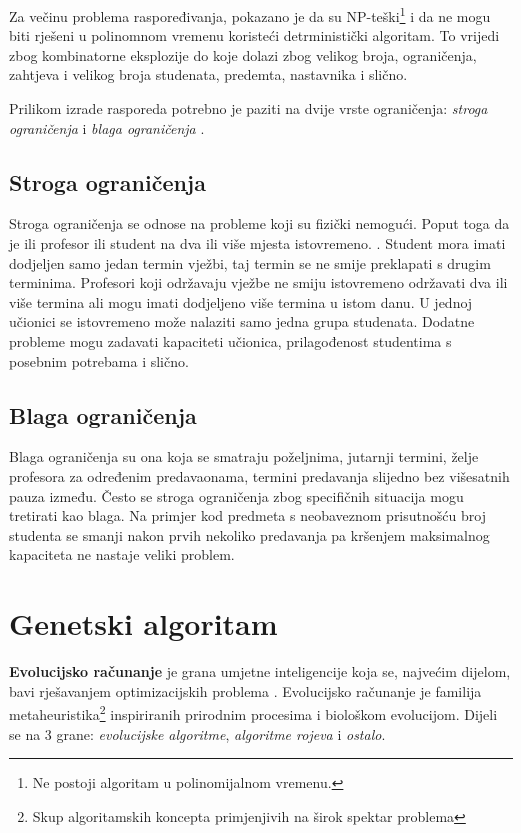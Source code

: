 \documentclass[times, utf8, zavrsni]{fer}
\begin{document}
Za večinu problema raspoređivanja, pokazano je da su NP-teški\footnote{Ne postoji algoritam u polinomijalnom vremenu.} i da ne mogu biti rješeni u polinomnom vremenu koristeći detrministički algoritam. To vrijedi zbog kombinatorne eksplozije do koje dolazi zbog velikog broja, ograničenja, zahtjeva i velikog broja studenata, predemta, nastavnika i slično.

Prilikom izrade rasporeda potrebno je paziti na dvije vrste ograničenja: \emph{stroga ograničenja}  i \emph{blaga ograničenja} .

\section{Stroga ograničenja}

Stroga ograničenja se odnose na probleme koji su fizički nemogući. Poput toga da je ili profesor ili student na dva ili više mjesta istovremeno. \citep{herath2017genetic}. Student mora imati dodjeljen samo jedan termin vježbi, taj termin se ne smije preklapati s drugim terminima. Profesori koji održavaju vježbe ne smiju istovremeno održavati dva ili više termina ali mogu imati dodjeljeno više termina u istom danu. U jednoj učionici se istovremeno može nalaziti samo jedna grupa studenata. Dodatne probleme mogu zadavati kapaciteti učionica, prilagođenost studentima s posebnim potrebama i slično.

\section{Blaga ograničenja}
Blaga ograničenja su ona koja se smatraju poželjnima, jutarnji termini, želje profesora za određenim predavaonama, termini predavanja slijedno bez višesatnih pauza između. Često se stroga ograničenja zbog specifičnih situacija mogu tretirati kao blaga. Na primjer kod predmeta s neobaveznom prisutnošću broj studenta se smanji nakon prvih nekoliko predavanja pa kršenjem maksimalnog kapaciteta ne nastaje veliki problem.

\chapter{Genetski algoritam}
\textbf{Evolucijsko računanje} je grana umjetne inteligencije koja se, najvećim dijelom, bavi rješavanjem optimizacijskih problema \citep{cupic-disertacija}. Evolucijsko računanje je familija metaheuristika\footnote{Skup algoritamskih koncepta primjenjivih na širok spektar problema} inspiriranih prirodnim procesima i biološkom evolucijom. Dijeli se na  3 grane: \emph{evolucijske algoritme}, \emph{algoritme rojeva} i \emph{ostalo}. 
\end{document}
